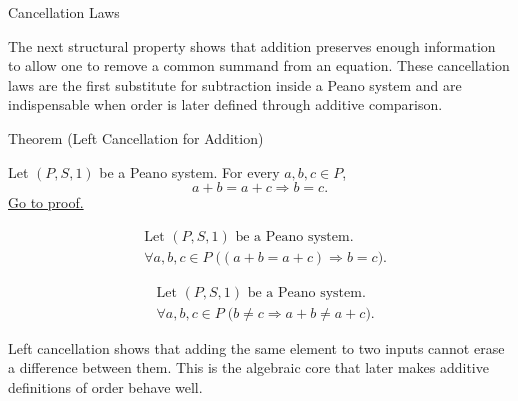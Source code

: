 \begin{topicbox}{Cancellation Laws}
\begin{exposition}
The next structural property shows that addition preserves enough information
to allow one to remove a common summand from an equation. These cancellation
laws are the first substitute for subtraction inside a Peano system and are
indispensable when order is later defined through additive comparison.
\end{exposition}

\begin{theorembox}{Theorem (Left Cancellation for Addition)}
\begin{theorem}
\label{thm:addition-left-cancellation}
Let $(P,S,1)$ be a Peano system. For every $a,b,c \in P$,
\[
a+b=a+c
\Longrightarrow
b=c.
\]
\hyperref[prf:addition-left-cancellation]{Go to proof.}
\end{theorem}
\end{theorembox}

\begin{remark*}
\[
\begin{aligned}
&\text{Let } (P,S,1) \text{ be a Peano system.}\\
&\forall a,b,c \in P\;\bigl((a+b=a+c) \Longrightarrow b=c\bigr).
\end{aligned}
\]
\end{remark*}

\begin{remark*}
\[
\begin{aligned}
&\text{Let } (P,S,1) \text{ be a Peano system.}\\
&\forall a,b,c \in P\;\bigl(b \neq c \Longrightarrow a+b \neq a+c\bigr).
\end{aligned}
\]
\end{remark*}

\begin{remark*}[Interpretation]
Left cancellation shows that adding the same element to two inputs cannot
erase a difference between them. This is the algebraic core that later makes
additive definitions of order behave well.
\end{remark*}


\end{topicbox}
